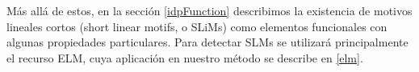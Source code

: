 


Más allá de estos, en la sección \ref{idpFunction} describimos la existencia de motivos lineales cortos (short linear motifs, o SLiMs) como elementos funcionales con algunas propiedades particulares.  
Para detectar SLMs se utilizará principalmente el recurso ELM, cuya aplicación en nuestro método se describe en \ref{elm}.


